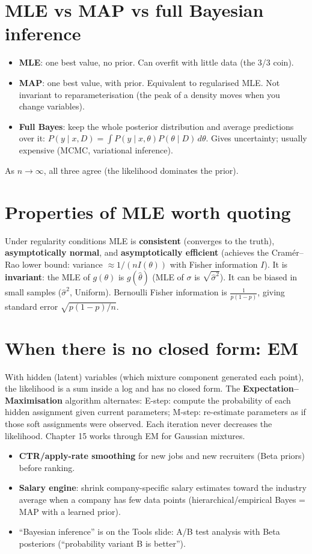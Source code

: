 \section{MLE vs MAP vs full Bayesian inference}
\begin{itemize}
\item \textbf{MLE}: one best value, no prior. Can overfit with little data (the 3/3 coin).
\item \textbf{MAP}: one best value, with prior. Equivalent to regularised MLE. Not invariant to reparameterisation (the peak of a
  density moves when you change variables).
\item \textbf{Full Bayes}: keep the whole posterior distribution and average predictions over it: $P(y\mid x, D) = \int P(y\mid x,\theta)
  P(\theta\mid D)\,d\theta$. Gives uncertainty; usually expensive (MCMC, variational inference).
\end{itemize}
As $n\to\infty$, all three agree (the likelihood dominates the prior).

\section{Properties of MLE worth quoting}
Under regularity conditions MLE is \textbf{consistent} (converges to the truth), \textbf{asymptotically normal}, and
\textbf{asymptotically efficient} (achieves the Cram\'er--Rao lower bound: variance $\approx 1/(nI(\theta))$ with Fisher information
$I$). It is \textbf{invariant}: the MLE of $g(\theta)$ is $g(\hat\theta)$ (MLE of $\sigma$ is $\sqrt{\hat\sigma^2}$). It can be biased in small
samples ($\hat\sigma^2$, Uniform). Bernoulli Fisher information is $\frac{1}{p(1-p)}$, giving standard error $\sqrt{p(1-p)/n}$.

\section{When there is no closed form: EM}
With hidden (latent) variables (which mixture component generated each point), the likelihood is a sum inside a log and has no closed
form. The \textbf{Expectation--Maximisation} algorithm alternates: E-step: compute the probability of each hidden assignment given
current parameters; M-step: re-estimate parameters as if those soft assignments were observed. Each iteration never decreases the
likelihood. Chapter 15 works through EM for Gaussian mixtures.

\begin{practical}
\begin{itemize}
\item \textbf{CTR/apply-rate smoothing} for new jobs and new recruiters (Beta priors) before ranking.
\item \textbf{Salary engine}: shrink company-specific salary estimates toward the industry average when a company has few data points
  (hierarchical/empirical Bayes = MAP with a learned prior).
\item ``Bayesian inference'' is on the Tools slide: A/B test analysis with Beta posteriors (``probability variant B is better'').
\end{itemize}
\end{practical}

